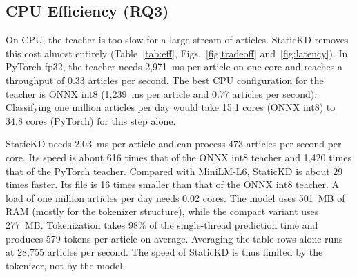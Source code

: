 \documentclass[journal]{IEEEtran}
\begin{document}
\subsection{CPU Efficiency (RQ3)}
\label{sec:res-eff}
\begin{table}[!t]
\caption{CPU Efficiency on Pinned P-Cores (Sample From the Unified Test Set, 1c/4c = 1/4 Cores)}
\label{tab:eff}
\centering
\footnotesize
{}
\end{table}
On CPU, the teacher is too slow for a large stream of articles. StaticKD removes this cost almost entirely (Table~\ref{tab:eff}, Figs.~\ref{fig:tradeoff} and~\ref{fig:latency}). In PyTorch fp32, the teacher needs 2,971~ms per article on one core and reaches a throughput of 0.33 articles per second. The best CPU configuration for the teacher is ONNX int8 (1,239~ms per article and 0.77 articles per second). Classifying one million articles per day would take 15.1 cores (ONNX int8) to 34.8 cores (PyTorch) for this step alone.

StaticKD needs 2.03~ms per article and can process 473 articles per second per core. Its speed is about 616 times that of the ONNX int8 teacher and 1,420 times that of the PyTorch teacher. Compared with MiniLM-L6, StaticKD is about 29 times faster. Its file is 16 times smaller than that of the ONNX int8 teacher. A load of one million articles per day needs 0.02 cores. The model uses 501~MB of RAM (mostly for the tokenizer structure), while the compact variant uses 277~MB. Tokenization takes 98\% of the single-thread prediction time and produces 579 tokens per article on average. Averaging the table rows alone runs at 28,755 articles per second. The speed of StaticKD is thus limited by the tokenizer, not by the model.
\end{document}
